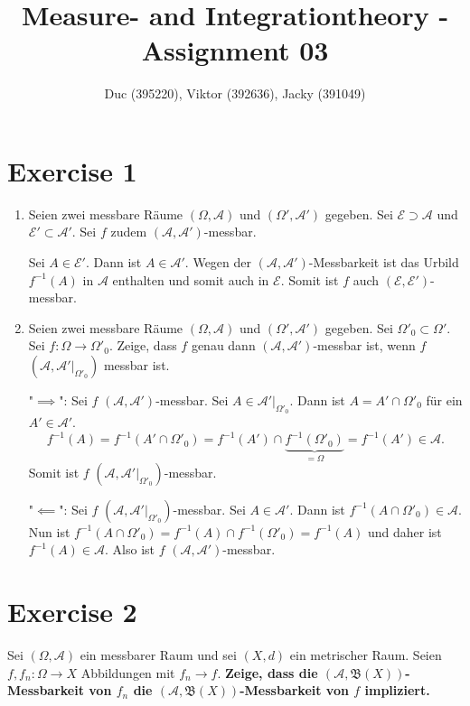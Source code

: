 \documentclass{article}
\title{Measure- and Integrationtheory - Assignment 03}
\author{Duc (395220), Viktor (392636), Jacky (391049)}
\begin{document}
\maketitle

\section*{Exercise 1}
\begin{enumerate}[label=(\roman*)]
    \item Seien zwei messbare Räume $(\Omega, \mathcal A)$ und $(\Omega', \mathcal A')$ gegeben. Sei $\mathcal E \supset \mathcal A$ und $\mathcal E' \subset \mathcal A'$. Sei $f$ zudem $(\mathcal A, \mathcal A')$-messbar.
    
    Sei $A \in \mathcal E'$. Dann ist $A \in \mathcal A'$. Wegen der $(\mathcal A, \mathcal A')$-Messbarkeit ist das Urbild $f^{-1}(A)$ in $\mathcal A$ enthalten und somit auch in $\mathcal E$. Somit ist $f$ auch $(\mathcal E, \mathcal E')$-messbar.
 
    \item Seien zwei messbare Räume $(\Omega, \mathcal A)$ und $(\Omega', \mathcal A')$ gegeben. Sei $\Omega'_0 \subset \Omega'$. Sei $f: \Omega \to \Omega'_0$. Zeige, dass $f$ genau dann $(\mathcal A, \mathcal A')$-messbar ist, wenn $f$ $(\mathcal A, \mathcal A'|_{\Omega'_0})$ messbar ist.
    
    "$\implies$": Sei $f$ $(\mathcal A, \mathcal A')$-messbar. Sei $A \in \mathcal A'|_{\Omega'_0}$. Dann ist $A = A' \cap \Omega'_0$ für ein $A' \in \mathcal A'$. 
    $$
        f^{-1}(A) = f^{-1}(A' \cap \Omega'_0) = f^{-1}(A') \cap \underbrace{f^{-1}(\Omega'_0)}_{= \Omega} = f^{-1}(A') \in \mathcal A.
    $$
    Somit ist $f$ $(\mathcal A, \mathcal A'|_{\Omega'_0})$-messbar.

    "$\impliedby$": Sei $f$ $(\mathcal A, \mathcal A'|_{\Omega'_0})$-messbar. Sei $A \in \mathcal A'$. Dann ist $f^{-1}(A \cap \Omega'_0) \in \mathcal A$. Nun ist $f^{-1}(A \cap \Omega'_0) = f^{-1}(A) \cap f^{-1}(\Omega'_0) = f^{-1}(A)$ und daher ist $f^{-1}(A)  \in \mathcal A$. Also ist $f$ $(\mathcal A, \mathcal A')$-messbar.
\end{enumerate}




\section*{Exercise 2}

Sei $(\Omega, \mathcal A)$ ein messbarer Raum und sei $(X,d)$ ein metrischer Raum. Seien $f,f_n: \Omega \to X$ Abbildungen mit $f_n \to f$. \textbf{Zeige, dass die $(\mathcal A, \mathfrak B(X))$-Messbarkeit von $f_n$ die $(\mathcal A, \mathfrak B(X))$-Messbarkeit von $f$ impliziert.}
\end{document}
